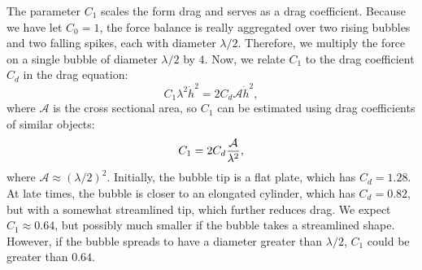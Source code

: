The parameter $C_1$ scales the form drag and serves as a drag coefficient.  
Because we have let $C_0 = 1$, the force balance is really aggregated over two rising bubbles and two falling spikes, each with diameter $\lambda / 2$.
Therefore, we multiply the force on a single bubble of diameter $\lambda/2$ by 4.
Now, we relate $C_1$ to the drag coefficient $C_d$ in the drag equation:
\begin{equation}
	C_1 \lambda^2 \dot{h}^2 = 2 C_d \mathcal{A} \dot{h}^2,
\end{equation}
where $\mathcal{A}$ is the cross sectional area,
so $C_1$ can be estimated using drag coefficients of similar objects:
\begin{equation} \elabel{prior_c1}
C_1 = 2 C_d \frac{
	\mathcal{A}}{\lambda^2},
\end{equation}
where $\mathcal{A} \approx (\lambda/2)^2$.
Initially, the bubble tip is a flat plate, which has $C_d = 1.28$.
At late times, the bubble is closer to an elongated cylinder, which has $C_d = 0.82$, but with a somewhat streamlined tip, which further reduces drag.
We expect $C_1 \approx 0.64$, but possibly much smaller if the bubble takes a streamlined shape.
However, if the bubble spreads to have a diameter greater than $\lambda / 2$, $C_1$ could be greater than $0.64$.

